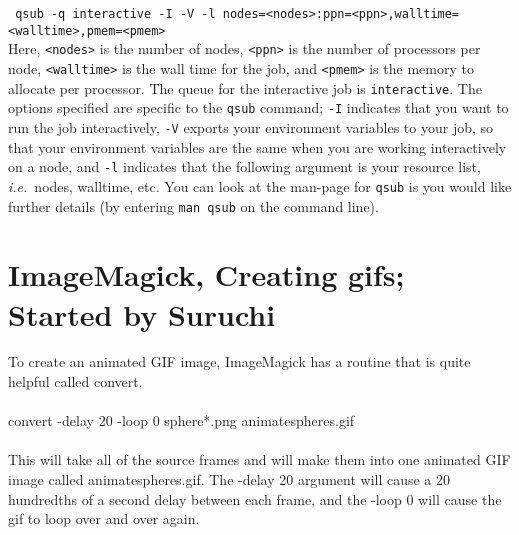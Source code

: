 \documentclass[aip,jmp,superscriptaddress,reprint,onecolumn]{revtex4-1}
\newcommand{\ie}{\emph{i.e.}}
\begin{document}
\noindent
\texttt{ qsub -q interactive -I -V -l nodes=<nodes>:ppn=<ppn>,walltime=<walltime>,pmem=<pmem>}
\\

\noindent
Here, \texttt{<nodes>} is the number of nodes, \texttt{<ppn>} is the number of processors per node, \texttt{<walltime>} is the wall time for the job,
and \texttt{<pmem>} is the memory to allocate per processor.
The queue for the interactive job is \texttt{interactive}. 
The options specified are specific to the \texttt{qsub} command; \texttt{-I} indicates that you want to run the job interactively,
\texttt{-V} exports your environment variables to your job, so that your environment variables are the same when you are working interactively on a node,
and \texttt{-l} indicates that the following argument is your resource list, \ie \ nodes, walltime, etc. You can look at the man-page for \texttt{qsub} is you
would like further details (by entering \texttt{man qsub} on the command line).


\section{ImageMagick, Creating gifs; Started by Suruchi}

\noindent
To create an animated GIF image, ImageMagick has a routine that is quite helpful called convert. 
\\
\\
convert   -delay 20   -loop 0   sphere*.png   animatespheres.gif
\\
\\
This will take all of the source frames and will make them into one animated GIF image called animatespheres.gif. The -delay 20 argument will cause a 20 hundredths of a second delay between each frame, and the -loop 0 will cause the gif to loop over and over again.
\end{document}
